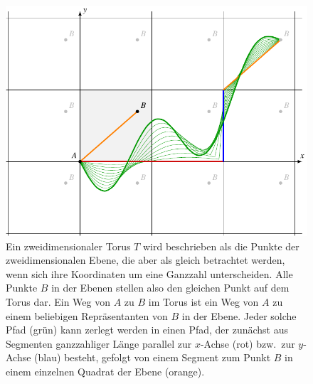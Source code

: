 %
%
%
\begin{figure}
\centering
\includegraphics{chapters/120-topologie/images/toruspfade.pdf}
\caption{Ein zweidimensionaler Torus $T$ wird beschrieben als die
Punkte der zweidimensionalen Ebene, die aber als gleich betrachtet
werden, wenn sich ihre Koordinaten um eine Ganzzahl unterscheiden.
%
Alle Punkte $B$ in der Ebenen stellen also den gleichen Punkt auf dem
Torus dar.
Ein Weg von $A$ zu $B$ im Torus ist ein Weg von $A$ zu einem beliebigen
Repräsentanten von $B$ in der Ebene.
Jeder solche Pfad ({\color{darkgreen}grün}) kann zerlegt werden in
einen Pfad, der zunächst aus Segmenten ganzzahliger Länge parallel
zur $x$-Achse ({\color{darkred}rot}) bzw.~zur $y$-Achse
({\color{blue}blau}) besteht, gefolgt von einem Segment zum Punkt
$B$ in einem einzelnen Quadrat der Ebene ({\color{orange}orange}).
\label{buch:topologie:kohomologie:fig:toruspfade}}
\end{figure}

